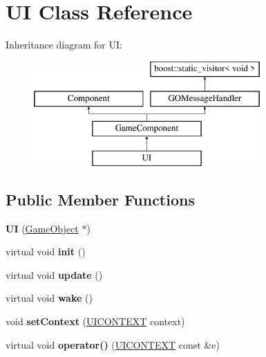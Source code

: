 \hypertarget{class_u_i}{}\section{UI Class Reference}
\label{class_u_i}
Inheritance diagram for UI\+:\begin{figure}[H]
\begin{center}
\leavevmode
\includegraphics[height=4.000000cm]{class_u_i}
\end{center}
\end{figure}
\subsection*{Public Member Functions}
\begin{DoxyCompactItemize}
\item 
\hypertarget{class_u_i_ab299e77b21896655f94ef84c727a4e22}{}\label{class_u_i_ab299e77b21896655f94ef84c727a4e22} 
{\bfseries UI} (\hyperlink{class_game_object}{Game\+Object} $\ast$)
\item 
\hypertarget{class_u_i_a2277decc2cba013de2fbb5a64fbc1543}{}\label{class_u_i_a2277decc2cba013de2fbb5a64fbc1543} 
virtual void {\bfseries init} ()
\item 
\hypertarget{class_u_i_a47c96192a9924bbd6c6b610922770988}{}\label{class_u_i_a47c96192a9924bbd6c6b610922770988} 
virtual void {\bfseries update} ()
\item 
\hypertarget{class_u_i_ae16be0e89513445e6a75e7cd92ba6d90}{}\label{class_u_i_ae16be0e89513445e6a75e7cd92ba6d90} 
virtual void {\bfseries wake} ()
\item 
\hypertarget{class_u_i_a09ee528ce56244fb5205dfaf0fbe6c22}{}\label{class_u_i_a09ee528ce56244fb5205dfaf0fbe6c22} 
void {\bfseries set\+Context} (\hyperlink{struct_u_i_c_o_n_t_e_x_t}{U\+I\+C\+O\+N\+T\+E\+XT} context)
\item 
\hypertarget{class_u_i_a7a1beee6c64d0fce1f6e4dc720b08ea3}{}\label{class_u_i_a7a1beee6c64d0fce1f6e4dc720b08ea3} 
virtual void {\bfseries operator()} (\hyperlink{struct_u_i_c_o_n_t_e_x_t}{U\+I\+C\+O\+N\+T\+E\+XT} const \&e)
\end{DoxyCompactItemize}
